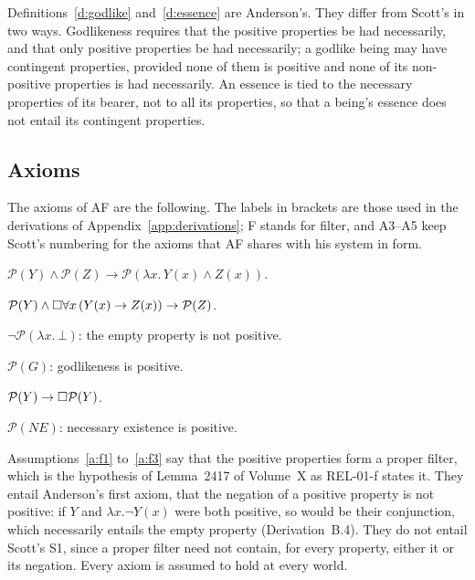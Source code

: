 \documentclass{situationist-preprint}
\newcommand{\Pos}{\mathcal{P}}
\newcommand{\NE}{\mathit{NE}}
\begin{document}
Definitions~\ref{d:godlike} and~\ref{d:essence} are Anderson's. They differ from Scott's in two ways. Godlikeness requires that the positive properties be had necessarily, and that only positive properties be had necessarily; a godlike being may have contingent properties, provided none of them is positive and none of its non-positive properties is had necessarily. An essence is tied to the necessary properties of its bearer, not to all its properties, so that a being's essence does not entail its contingent properties.

\subsection{Axioms}

The axioms of AF are the following. The labels in brackets are those used in the derivations of Appendix~\ref{app:derivations}; F stands for filter, and A3--A5 keep Scott's numbering for the axioms that AF shares with his system in form.

\begin{assumption}[F1, conjunction]\label{a:f1}
$\Pos(Y) \wedge \Pos(Z) \to \Pos(\lambda x.\,Y(x) \wedge Z(x))$.
\end{assumption}

\begin{assumption}[F2, entailment]\label{a:f2}
$\Pos(Y) \wedge \nec\forall x\,(Y(x) \to Z(x)) \to \Pos(Z)$.
\end{assumption}

\begin{assumption}[F3, properness]\label{a:f3}
$\neg\Pos(\lambda x.\,\bot)$: the empty property is not positive.
\end{assumption}

\begin{assumption}[A3]\label{a:a3}
$\Pos(G)$: godlikeness is positive.
\end{assumption}

\begin{assumption}[A4]\label{a:a4}
$\Pos(Y) \to \nec\Pos(Y)$.
\end{assumption}

\begin{assumption}[A5]\label{a:a5}
$\Pos(\NE)$: necessary existence is positive.
\end{assumption}

Assumptions~\ref{a:f1} to~\ref{a:f3} say that the positive properties form a proper filter, which is the hypothesis of Lemma~2417 of Volume~X as REL-01-f states it. They entail Anderson's first axiom, that the negation of a positive property is not positive: if $Y$ and $\lambda x.\neg Y(x)$ were both positive, so would be their conjunction, which necessarily entails the empty property (Derivation~B.4). They do not entail Scott's S1, since a proper filter need not contain, for every property, either it or its negation. Every axiom is assumed to hold at every world.
\end{document}
